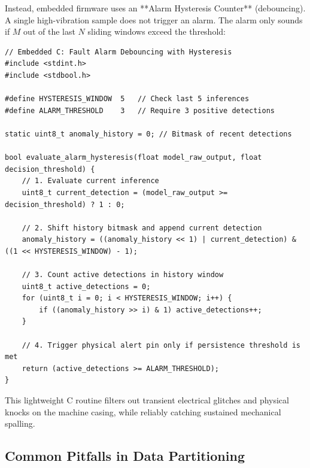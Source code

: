 \begin{iotbox}
Instead, embedded firmware uses an **Alarm Hysteresis Counter** (debouncing). A single high-vibration sample does not trigger an alarm. The alarm only sounds if $M$ out of the last $N$ sliding windows exceed the threshold:

\begin{lstlisting}[style=pythonstyle]
// Embedded C: Fault Alarm Debouncing with Hysteresis
#include <stdint.h>
#include <stdbool.h>

#define HYSTERESIS_WINDOW  5   // Check last 5 inferences
#define ALARM_THRESHOLD    3   // Require 3 positive detections

static uint8_t anomaly_history = 0; // Bitmask of recent detections

bool evaluate_alarm_hysteresis(float model_raw_output, float decision_threshold) {
    // 1. Evaluate current inference
    uint8_t current_detection = (model_raw_output >= decision_threshold) ? 1 : 0;

    // 2. Shift history bitmask and append current detection
    anomaly_history = ((anomaly_history << 1) | current_detection) & ((1 << HYSTERESIS_WINDOW) - 1);

    // 3. Count active detections in history window
    uint8_t active_detections = 0;
    for (uint8_t i = 0; i < HYSTERESIS_WINDOW; i++) {
        if ((anomaly_history >> i) & 1) active_detections++;
    }

    // 4. Trigger physical alert pin only if persistence threshold is met
    return (active_detections >= ALARM_THRESHOLD);
}
\end{lstlisting}
This lightweight C routine filters out transient electrical glitches and physical knocks on the machine casing, while reliably catching sustained mechanical spalling.
\end{iotbox}

\subsection{Common Pitfalls in Data Partitioning}\label{subsec:splitting_pitfalls_summary}

